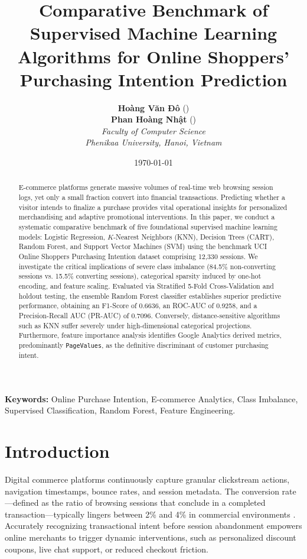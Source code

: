 \documentclass[11pt,a4paper]{article}
\title{\LARGE \textbf{\textcolor{primaryblue}{Comparative Benchmark of Supervised Machine Learning Algorithms for Online Shoppers' Purchasing Intention Prediction}}}
\author{
    \textbf{Hoàng Văn Đô} \quad (\text{Student ID: 24107948}) \\
    \textbf{Phan Hoàng Nhật} \quad (\text{Student ID: 24100092}) \\[1ex]
    \textit{Faculty of Computer Science} \\
    \textit{Phenikaa University, Hanoi, Vietnam}
}
\date{\today}
\begin{document}
\maketitle

\begin{abstract}
E-commerce platforms generate massive volumes of real-time web browsing session logs, yet only a small fraction convert into financial transactions. Predicting whether a visitor intends to finalize a purchase provides vital operational insights for personalized merchandising and adaptive promotional interventions. In this paper, we conduct a systematic comparative benchmark of five foundational supervised machine learning models: Logistic Regression, $K$-Nearest Neighbors (KNN), Decision Trees (CART), Random Forest, and Support Vector Machines (SVM) using the benchmark UCI Online Shoppers Purchasing Intention dataset comprising 12,330 sessions. We investigate the critical implications of severe class imbalance (84.5\% non-converting sessions vs. 15.5\% converting sessions), categorical sparsity induced by one-hot encoding, and feature scaling. Evaluated via Stratified 5-Fold Cross-Validation and holdout testing, the ensemble Random Forest classifier establishes superior predictive performance, obtaining an F1-Score of 0.6636, an ROC-AUC of 0.9258, and a Precision-Recall AUC (PR-AUC) of 0.7096. Conversely, distance-sensitive algorithms such as KNN suffer severely under high-dimensional categorical projections. Furthermore, feature importance analysis identifies Google Analytics derived metrics, predominantly \texttt{PageValues}, as the definitive discriminant of customer purchasing intent.
\end{abstract}

\noindent \textbf{Keywords:} Online Purchase Intention, E-commerce Analytics, Class Imbalance, Supervised Classification, Random Forest, Feature Engineering.

\section{Introduction}
Digital commerce platforms continuously capture granular clickstream actions, navigation timestamps, bounce rates, and session metadata. The conversion rate—defined as the ratio of browsing sessions that conclude in a completed transaction—typically lingers between 2\% and 4\% in commercial environments \cite{sakar2019real}. Accurately recognizing transactional intent before session abandonment empowers online merchants to trigger dynamic interventions, such as personalized discount coupons, live chat support, or reduced checkout friction.
\end{document}
